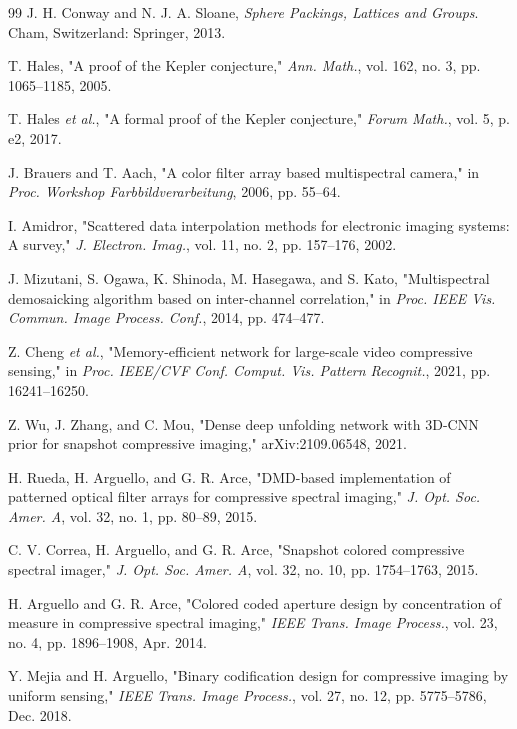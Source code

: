 \documentclass[journal]{IEEEtran}
\begin{document}
\begin{thebibliography}{99}
J. H. Conway and N. J. A. Sloane, \emph{Sphere Packings, Lattices and Groups}. Cham, Switzerland: Springer, 2013.

T. Hales, "A proof of the Kepler conjecture," \emph{Ann. Math.}, vol. 162, no. 3, pp. 1065--1185, 2005.

T. Hales \emph{et al.}, "A formal proof of the Kepler conjecture," \emph{Forum Math.}, vol. 5, p. e2, 2017.

J. Brauers and T. Aach, "A color filter array based multispectral camera," in \emph{Proc. Workshop Farbbildverarbeitung}, 2006, pp. 55--64.

I. Amidror, "Scattered data interpolation methods for electronic imaging systems: A survey," \emph{J. Electron. Imag.}, vol. 11, no. 2, pp. 157--176, 2002.

J. Mizutani, S. Ogawa, K. Shinoda, M. Hasegawa, and S. Kato, "Multispectral demosaicking algorithm based on inter-channel correlation," in \emph{Proc. IEEE Vis. Commun. Image Process. Conf.}, 2014, pp. 474--477.

Z. Cheng \emph{et al.}, "Memory-efficient network for large-scale video compressive sensing," in \emph{Proc. IEEE/CVF Conf. Comput. Vis. Pattern Recognit.}, 2021, pp. 16241--16250.

Z. Wu, J. Zhang, and C. Mou, "Dense deep unfolding network with 3D-CNN prior for snapshot compressive imaging," arXiv:2109.06548, 2021.

H. Rueda, H. Arguello, and G. R. Arce, "DMD-based implementation of patterned optical filter arrays for compressive spectral imaging," \emph{J. Opt. Soc. Amer. A}, vol. 32, no. 1, pp. 80--89, 2015.

C. V. Correa, H. Arguello, and G. R. Arce, "Snapshot colored compressive spectral imager," \emph{J. Opt. Soc. Amer. A}, vol. 32, no. 10, pp. 1754--1763, 2015.

H. Arguello and G. R. Arce, "Colored coded aperture design by concentration of measure in compressive spectral imaging," \emph{IEEE Trans. Image Process.}, vol. 23, no. 4, pp. 1896--1908, Apr. 2014.

Y. Mejia and H. Arguello, "Binary codification design for compressive imaging by uniform sensing," \emph{IEEE Trans. Image Process.}, vol. 27, no. 12, pp. 5775--5786, Dec. 2018.


\end{thebibliography}
\end{document}
